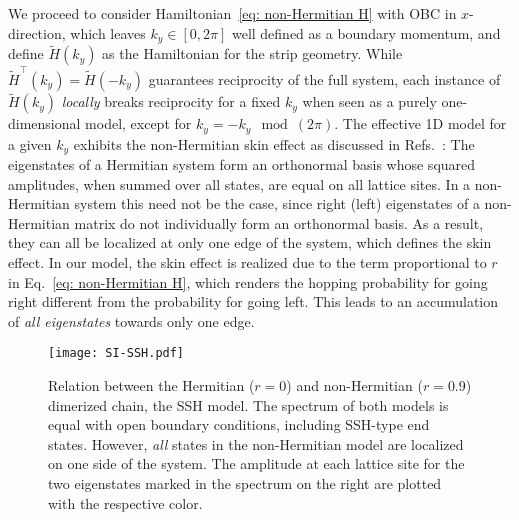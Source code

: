 We proceed to consider Hamiltonian~\eqref{eq: non-Hermitian H} with OBC in $x$-direction, which leaves $k_y \in [0,2\pi]$ well defined as a boundary momentum, and define $\tilde{H}(k_y)$ as the Hamiltonian for the strip geometry. While $\tilde{H}^\top(k_y) = \tilde{H}(-k_y)$ guarantees reciprocity of the full system, each instance of $\tilde{H}(k_y)$ \textit{locally} breaks reciprocity for a fixed $k_y$ when seen as a purely one-dimensional model, except for $k_y = - k_y \mod(2\pi)$. The effective 1D model for a given $k_y$ exhibits the non-Hermitian skin effect as discussed in Refs.~\cite{Shunyu2018prl,song2019non}: The eigenstates of a Hermitian system form an orthonormal basis whose squared amplitudes, when summed over all states, are equal on all lattice sites. In a non-Hermitian system this need not be the case, since right (left) eigenstates of a non-Hermitian matrix do not individually form an orthonormal basis. As a result, they can all be localized at only one edge of the system, which defines the skin effect. In our model, the skin effect is realized due to the term proportional to $r$ in Eq.~\eqref{eq: non-Hermitian H}, which renders the hopping probability for going right different from the probability for going left. This leads to an accumulation of \emph{all eigenstates} towards only one edge.


\begin{figure*}[t]
\begin{center}
\texttt{[image: SI-SSH.pdf]}
\caption{
Relation between the Hermitian ($r = 0$) and non-Hermitian ($r = 0.9$) dimerized chain, the SSH model. The spectrum of both models is equal with open boundary conditions, including SSH-type end states. However, \emph{all} states in the non-Hermitian model are localized on one side of the system. 
The amplitude at each lattice site for the two eigenstates marked in the spectrum on the right are plotted with the respective color.
}
\label{fig: nonunitarytransform}
\end{center}
\end{figure*}

